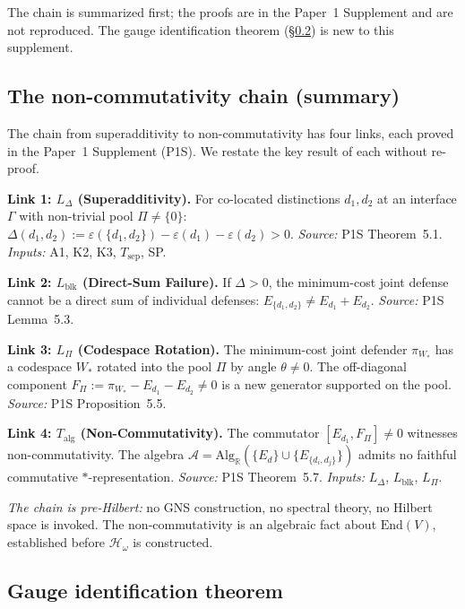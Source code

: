 \documentclass[11pt,a4paper]{article}
\theoremstyle{definition}
\newcommand{\eps}{\varepsilon}
\newcommand{\End}{\mathrm{End}}
\begin{document}
The chain is summarized first; the proofs are in the Paper~1 Supplement
and are not reproduced.  The gauge identification theorem
(\S\ref{sec:gauge_ident}) is new to this supplement.


\subsection{The non-commutativity chain (summary)}
\label{sec:nc_summary}

The chain from superadditivity to non-commutativity has four links,
each proved in the Paper~1 Supplement (P1S).  We restate the key result
of each without re-proof.

\smallskip\noindent\textbf{Link 1: $L_\Delta$ (Superadditivity).}
For co-located distinctions $d_1, d_2$ at an interface $\Gamma$ with
non-trivial pool $\Pi \ne \{0\}$:
$\Delta(d_1, d_2) := \eps(\{d_1, d_2\}) - \eps(d_1) - \eps(d_2) > 0$.
\textit{Source:} P1S Theorem~5.1.  \textit{Inputs:} A1, K2, K3,
$T_{\mathrm{sep}}$, SP.

\smallskip\noindent\textbf{Link 2: $L_{\mathrm{blk}}$ (Direct-Sum Failure).}
If $\Delta > 0$, the minimum-cost joint defense cannot be a direct sum
of individual defenses: $E_{\{d_1,d_2\}} \ne E_{d_1} + E_{d_2}$.
\textit{Source:} P1S Lemma~5.3.

\smallskip\noindent\textbf{Link 3: $L_\Pi$ (Codespace Rotation).}
The minimum-cost joint defender $\pi_{W_*}$ has a codespace $W_*$ rotated
into the pool $\Pi$ by angle $\theta \ne 0$.  The off-diagonal component
$F_\Pi := \pi_{W_*} - E_{d_1} - E_{d_2} \ne 0$ is a new generator
supported on the pool.
\textit{Source:} P1S Proposition~5.5.

\smallskip\noindent\textbf{Link 4: $T_{\mathrm{alg}}$ (Non-Commutativity).}
The commutator $[E_{d_1}, F_\Pi] \ne 0$ witnesses non-commutativity.
The algebra $\mathcal{A} = \mathrm{Alg}_\mathbb{R}(\{E_d\} \cup
\{E_{\{d_i,d_j\}}\})$ admits no faithful commutative
$*$-representation.
\textit{Source:} P1S Theorem~5.7.  \textit{Inputs:} $L_\Delta$,
$L_{\mathrm{blk}}$, $L_\Pi$.

\smallskip\noindent\textit{The chain is pre-Hilbert:} no GNS
construction, no spectral theory, no Hilbert space is invoked.
The non-commutativity is an algebraic fact about $\End(V)$,
established before $\mathcal{H}_\omega$ is constructed.


\subsection{Gauge identification theorem}
\label{sec:gauge_ident}
\end{document}
